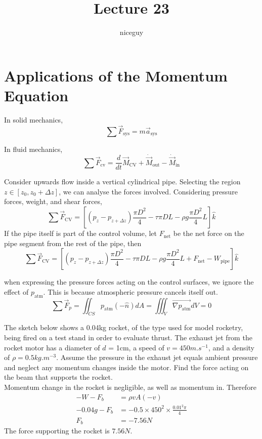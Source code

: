 \documentclass[12pt]{article}
\author{niceguy}
\title{Lecture 23}
\begin{document}
\maketitle

\section{Applications of the Momentum Equation}

In solid mechanics,
$$\sum\vec{F}_\mathrm{sys} = m\vec{a}_\mathrm{sys}$$

In fluid mechanics,
$$\sum\vec{F}_\mathrm{cv} = \frac{d}{dt} \vec{M}_\mathrm{CV} + \dot{\vec{M}}_\mathrm{out} - \dot{\vec{M}}_\mathrm{in}$$

\begin{ex}
	Consider upwards flow inside a vertical cylindrical pipe. Selecting the region $z \in [z_0,z_0+\Delta z]$, we can analyse the forces involved. Considering pressure forces, weight, and shear forces,
	$$\sum\vec{F}_\mathrm{CV} = \left[(p_z-p_{z+\Delta z})\frac{\pi D^2}{4} - \tau\pi DL - \rho g\frac{\pi D^2}{4}L\right]\hat{k}$$
	If the pipe itself is part of the control volume, let $F_\mathrm{net}$ be the net force on the pipe segment from the rest of the pipe, then
	$$\sum\vec{F}_\mathrm{CV} = \left[(p_z-p_{z+\Delta z})\frac{\pi D^2}{4} - \tau\pi DL - \rho g\frac{\pi D^2}{4}L + F_\mathrm{net} - W_\mathrm{pipe}\right]\hat{k}$$
\end{ex}

when expressing the pressure forces acting on the control surfaces, we ignore the effect of $p_\mathrm{atm}$. This is because atmospheric pressure cancels itself out.
$$\sum\vec{F}_p = \iint_{CS}p_\mathrm{atm}(-\hat{n})dA = \iiint_V\vec{\nabla p_\mathrm{atm}}dV = 0$$

\begin{ex}
	The sketch below shows a 0.04kg rocket, of the type used for model rocketry, being fired on a test stand in order to evaluate thrust. The exhaust jet from the rocket motor has a diameter of $d$ = 1cm, a speed of $v = 450\unit{m.s^{-1}}$, and a density of $\rho = 0.5\unit{kg.m^{-3}}$. Assume the pressure in the exhaust jet equals ambient pressure and neglect any momentum changes inside the motor. Find the force acting on the beam that supports the rocket. \\
	Momentum change in the rocket is negligible, as well as momentum in. Therefore
	\begin{align*}
		-W-F_b &= \rho vA(-v) \\
		-0.04g-F_b &= -0.5\times 450^2 \times \frac{0.01^2\pi}{4} \\
		F_b &= -7.56\unit{N}
	\end{align*}
	The force supporting the rocket is $7.56\unit{N}$.
\end{ex}
\end{document}
